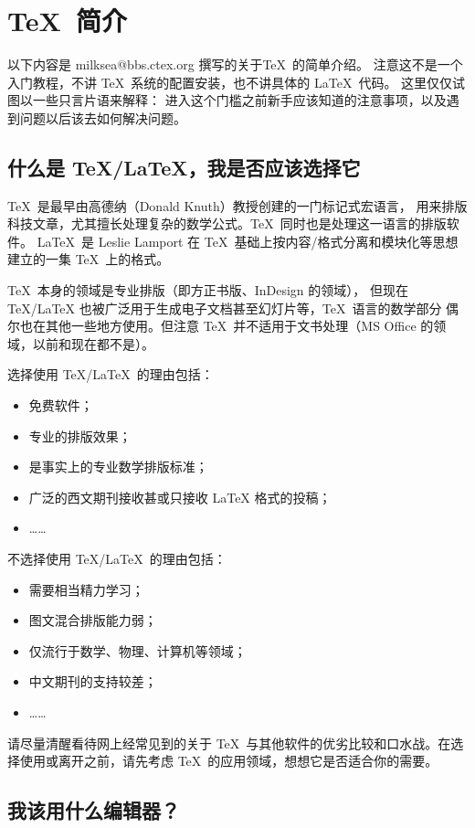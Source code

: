 \section{\TeX\ 简介}

以下内容是 milksea@bbs.ctex.org 撰写的关于\TeX\ 的简单介绍。
注意这不是一个入门教程，不讲 \TeX\ 系统的配置安装，也不讲具体的 \LaTeX\ 代码。
这里仅仅试图以一些只言片语来解释：
进入这个门槛之前新手应该知道的注意事项，以及遇到问题以后该去如何解决问题。

\subsection{什么是 \TeX/\LaTeX，我是否应该选择它}

\TeX\ 是最早由高德纳（Donald Knuth）教授创建的一门标记式宏语言，
用来排版科技文章，尤其擅长处理复杂的数学公式。\TeX\ 同时也是处理这一语言的排版软件。
\LaTeX\ 是 Leslie Lamport 在 \TeX\ 基础上按内容/格式分离和模块化等思想建立的一集 \TeX\ 上的格式。

\TeX\ 本身的领域是专业排版（即方正书版、InDesign 的领域），
但现在 TeX/LaTeX 也被广泛用于生成电子文档甚至幻灯片等，\TeX\ 语言的数学部分
偶尔也在其他一些地方使用。但注意 \TeX\ 并不适用于文书处理（MS Office 的领域，以前和现在都不是）。

选择使用 \TeX/\LaTeX\ 的理由包括：
\begin{itemize}
\item 免费软件；
\item 专业的排版效果；
\item 是事实上的专业数学排版标准；
\item 广泛的西文期刊接收甚或只接收 LaTeX 格式的投稿；
\item[] ……
\end{itemize}
不选择使用 \TeX/\LaTeX\ 的理由包括：
\begin{itemize}
\item 需要相当精力学习；
\item 图文混合排版能力弱；
\item 仅流行于数学、物理、计算机等领域；
\item 中文期刊的支持较差；
\item[] ……
\end{itemize}

请尽量清醒看待网上经常见到的关于 \TeX\ 与其他软件的优劣比较和口水战。在选择使用或离开之前，请先考虑
\TeX\ 的应用领域，想想它是否适合你的需要。

\def\AAAA{}

\subsection{我该用什么编辑器？}

